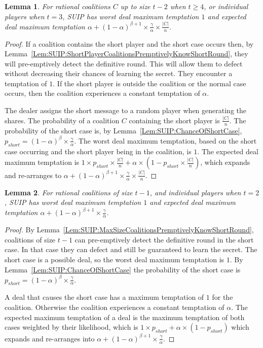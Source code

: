 \documentclass{dalcsthesis}
\newtheorem{lemma}{Lemma}
\begin{document}
\begin{lemma}\label{Lem:SUIP:AllCoalitionsTempted}For rational coalitions $C$ up to size $t-2$ when $t \geq 4$, or individual players when $t=3$, SUIP has worst deal maximum temptation $1$ and expected deal maximum temptation $\alpha + (1-\alpha)^{\beta+1} \times \frac{\gamma}{\alpha} \times \frac{|C|}{n}$.\end{lemma}
\begin{proof}
If a coalition contains the short player and the short case occurs then, by Lemma~\ref{Lem:SUIP:ShortPlayerCoalitionsPremptivelyKnowShortRound}, they will pre-emptively detect the definitive round. This will allow them to defect without decreasing their chances of learning the secret. They encounter a temptation of $1$. If the short player is outside the coalition or the normal case occurs, then the coalition experiences a constant temptation of $\alpha$.

The dealer assigns the short message to a random player when generating the shares. The probability of a coalition $C$ containing the short player is $\frac{|C|}{n}$. The probability of the short case is, by Lemma~\ref{Lem:SUIP:ChanceOfShortCase}, $p_{short} = (1-\alpha)^\beta \times \frac{\gamma}{\alpha}$. The worst deal maximum temptation, based on the short case occurring and the short player being in the coalition, is $1$. The expected deal maximum temptation is $1 \times p_{short} \times \frac{|C|}{n} + \alpha \times (1 - p_{short} \times \frac{|C|}{n})$, which expands and re-arranges to $\alpha + (1-\alpha)^{\beta+1} \times \frac{\gamma}{\alpha} \times \frac{|C|}{n}$.
\end{proof}

\begin{lemma}\label{Lem:SUIP:MaxSizeCoalitionsTemptedMore}For rational coalitions of size $t-1$, and individual players when $t=2$, SUIP has worst deal maximum temptation $1$ and expected deal maximum temptation $\alpha + (1-\alpha)^{\beta+1} \times \frac{\gamma}{\alpha}$.\end{lemma}
\begin{proof}
By Lemma~\ref{Lem:SUIP:MaxSizeCoalitionsPremptivelyKnowShortRound}, coalitions of size $t-1$ can pre-emptively detect the definitive round in the short case. In that case they can defect and still be guaranteed to learn the secret. The short case is a possible deal, so the worst deal maximum temptation is $1$. By Lemma~\ref{Lem:SUIP:ChanceOfShortCase} the probability of the short case is $p_{short} = (1-\alpha)^\beta \times \frac{\gamma}{\alpha}$.

A deal that causes the short case has a maximum temptation of $1$ for the coalition. Otherwise the coalition experiences a constant temptation of $\alpha$. The expected maximum temptation of a deal is the maximum temptation of both cases weighted by their likelihood, which is $1 \times p_{short} + \alpha \times (1-p_{short})$ which expands and re-arranges into $\alpha + (1-\alpha)^{\beta+1} \times \frac{\gamma}{\alpha}$.
\end{proof}
\end{document}
